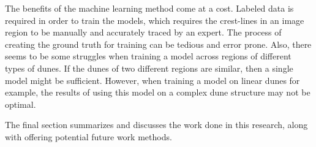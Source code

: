 The benefits of the machine learning method come at a cost. Labeled data is required in order to train the models, which requires the crest-lines in an image region to be manually and accurately traced by an expert. The process of creating the ground truth for training can be tedious and error prone. Also, there seems to be some struggles when training a model across regions of different types of dunes. If the dunes of two different regions are similar, then a single model might be sufficient. However, when training a model on linear dunes for example, the results of using this model on a complex dune structure may not be optimal.

The final section summarizes and discusses the work done in this research, along with offering potential future work methods. 